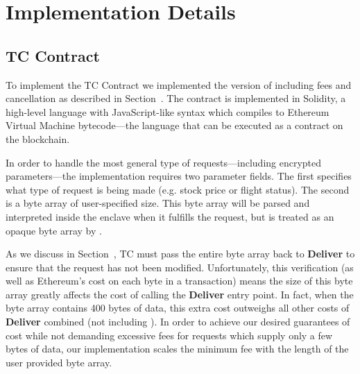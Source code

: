 \section{\tc Implementation Details}


\subsection{TC Contract}

To implement the TC Contract we implemented the version of \tcont including fees and cancellation as described in Section~.
The contract is implemented in Solidity, a high-level language with JavaScript-like syntax which compiles to Ethereum Virtual Machine bytecode---the language that can be executed as a contract on the blockchain.

In order to handle the most general type of requests---including encrypted parameters---the \tcont implementation requires two parameter fields.
The first specifies what type of request is being made (e.g. stock price or flight status).
The second is a byte array of user-specified size.
This byte array will be parsed and interpreted inside the enclave when it fulfills the request, but is treated as an opaque byte array by \tcont.

As we discuss in Section~, TC must pass the entire byte array back to {\bf Deliver} to ensure that the request has not been modified.
Unfortunately, this verification (as well as Ethereum's cost on each byte in a transaction) means the size of this byte array greatly affects the cost of calling the {\bf Deliver} entry point.
In fact, when the byte array contains 400 bytes of data, this extra cost outweighs all other costs of {\bf Deliver} combined (not including \dgcallback).
In order to achieve our desired guarantees of cost while not demanding excessive fees for requests which supply only a few bytes of data,
our implementation scales the minimum fee with the length of the user provided byte array.



